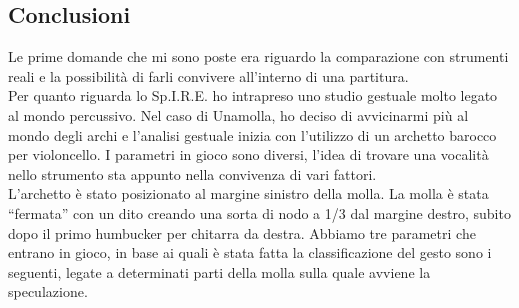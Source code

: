 \subsection{Conclusioni}

Le prime domande che mi sono poste era riguardo la comparazione con strumenti reali e la possibilità di farli convivere all’interno di una partitura. \\
Per quanto riguarda lo Sp.I.R.E. ho intrapreso uno studio gestuale molto legato al mondo percussivo. Nel caso di Unamolla, ho deciso di avvicinarmi più al mondo degli archi e l’analisi gestuale inizia con l’utilizzo di un archetto barocco per violoncello. I parametri in gioco sono diversi, l’idea di trovare una vocalità nello strumento sta appunto nella convivenza di vari fattori.\\
L’archetto è stato posizionato al margine sinistro della molla. La molla è stata “fermata” con un dito creando una sorta di nodo a 1/3  dal margine destro, subito dopo il primo humbucker per chitarra da destra. Abbiamo tre parametri che entrano in gioco, in base ai quali è stata fatta la classificazione del gesto sono i seguenti, legate a determinati parti della molla sulla quale avviene la speculazione.\\

